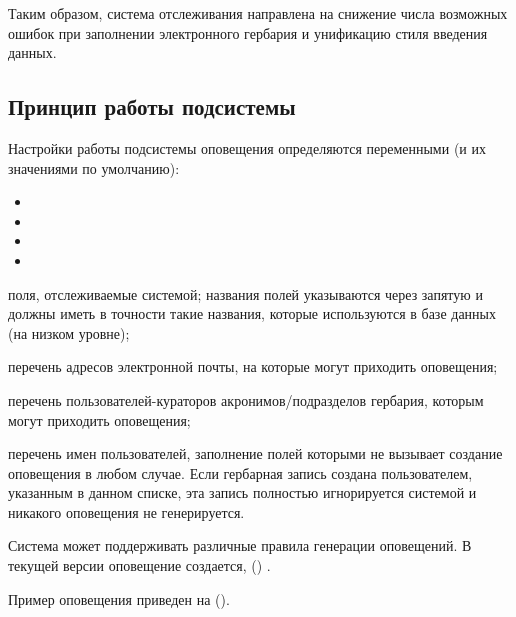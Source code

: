 \documentclass[letterpaper,10pt,russian]{sphinxmanual}
\begin{document}
Таким образом, система отслеживания направлена на снижение числа возможных ошибок при
заполнении электронного гербария и унификацию стиля введения данных.


\subsection{Принцип работы подсистемы}
\label{\detokenize{main:id57}}
Настройки работы подсистемы оповещения определяются переменными
(и их значениями по умолчанию):
\begin{itemize}
\item {} 

\item {} 

\item {} 

\item {} 

\end{itemize}

 \textendash{} поля, отслеживаемые системой; названия полей
указываются через запятую и должны иметь в точности такие названия,
которые используются в базе данных (на низком уровне);

 \textendash{} перечень адресов электронной почты,
на которые могут приходить оповещения;

 \textendash{} перечень пользователей-кураторов
акронимов/подразделов гербария, которым могут приходить оповещения;

 \textendash{}  перечень имен пользователей,
заполнение полей которыми не вызывает создание оповещения в любом случае.
Если гербарная запись создана пользователем, указанным в данном списке,
эта запись полностью игнорируется системой и никакого оповещения не генерируется.

Система может поддерживать различные правила генерации оповещений. В текущей версии
оповещение создается,  ()
.

Пример оповещения приведен на ({\hyperref[\detokenize{main:main-pic3}]{}}).
\end{document}
